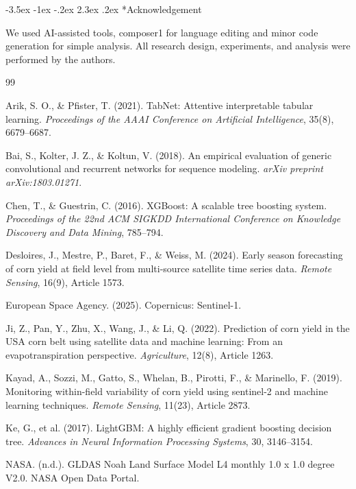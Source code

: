 \documentclass[10pt,twocolumn]{article}
\makeatletter
\renewcommand\section{\@startsection{section}{1}{\z@}%
  {-3.5ex \@plus -1ex \@minus -.2ex}%
  {2.3ex \@plus.2ex}%
  {\normalfont\large\bfseries}}
\makeatother
\begin{document}
\section*{Acknowledgement}

We used AI-assisted tools, composer1 for language editing and minor code generation for simple analysis.
All research design, experiments, and analysis were performed by the authors.

\balance

\begin{thebibliography}{99}
\small

Arik, S. O., \& Pfister, T. (2021). TabNet: Attentive interpretable tabular learning. \textit{Proceedings of the AAAI Conference on Artificial Intelligence}, 35(8), 6679--6687.

Bai, S., Kolter, J. Z., \& Koltun, V. (2018). An empirical evaluation of generic convolutional and recurrent networks for sequence modeling. \textit{arXiv preprint arXiv:1803.01271}.

Chen, T., \& Guestrin, C. (2016). XGBoost: A scalable tree boosting system. \textit{Proceedings of the 22nd ACM SIGKDD International Conference on Knowledge Discovery and Data Mining}, 785--794.

Desloires, J., Mestre, P., Baret, F., \& Weiss, M. (2024). Early season forecasting of corn yield at field level from multi-source satellite time series data. \textit{Remote Sensing}, 16(9), Article 1573.

European Space Agency. (2025). Copernicus: Sentinel-1.

Ji, Z., Pan, Y., Zhu, X., Wang, J., \& Li, Q. (2022). Prediction of corn yield in the USA corn belt using satellite data and machine learning: From an evapotranspiration perspective. \textit{Agriculture}, 12(8), Article 1263.

Kayad, A., Sozzi, M., Gatto, S., Whelan, B., Pirotti, F., \& Marinello, F. (2019). Monitoring within-field variability of corn yield using sentinel-2 and machine learning techniques. \textit{Remote Sensing}, 11(23), Article 2873.

Ke, G., et al. (2017). LightGBM: A highly efficient gradient boosting decision tree. \textit{Advances in Neural Information Processing Systems}, 30, 3146--3154.

NASA. (n.d.). GLDAS Noah Land Surface Model L4 monthly 1.0 x 1.0 degree V2.0. NASA Open Data Portal.


\end{thebibliography}
\end{document}
